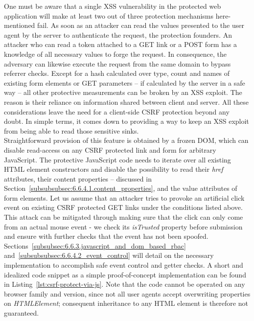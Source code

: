       One must be aware that a single XSS vulnerability in the protected web application will make at least two out of three protection mechanisms here-mentioned fail. As soon as an attacker can read the values presented to the user agent by the server to authenticate the request, the protection founders. An attacker who can read a token attached to a GET link or a POST form has a knowledge of all necessary values to forge the request. In consequence, the adversary can likewise execute the request from the same domain to bypass referrer checks. Except for a hash calculated over type, count and names of existing form elements or GET parameters -- if calculated by the server in a safe way -- all other protective measurements can be broken by an XSS exploit. The reason is their reliance on information shared between client and server. All these considerations leave the need for a client-side CSRF protection beyond any doubt. In simple terms, it comes down to providing a way to keep an XSS exploit from being able to read those sensitive sinks. \\

      Straightforward provision of this feature is obtained by a frozen DOM, which can disable read-access on any CSRF protected link and form for arbitrary JavaScript. The protective JavaScript code needs to iterate over all existing HTML element constructors and disable the possibility to read their \textit{href} attributes, their content properties -- discussed in Section~\ref{subsubsubsec:6.6.4.1.content_properties}, and the value attributes of form elements. 
      Let us assume that an attacker tries to provoke an artificial click event on existing CSRF protected GET links under the conditions listed above. This attack can be mitigated through making sure that the click can only come from an actual mouse event - we check its \textit{isTrusted} property before submission and ensure with further checks that the event has not been spoofed. Sections~\ref{subsubsec:6.6.3.javascript_and_dom_based_rbac} and~\ref{subsubsubsec:6.6.4.2_event_control} will detail on the necessary implementation to accomplish safe event control and getter checks. A short and idealized code snippet as a simple proof-of-concept implementation can be found in Listing~\ref{lst:csrf-protect-via-js}. Note that the code cannot be operated on any browser family and version, since not all user agents accept overwriting properties on \textit{HTMLElement}; consequent inheritance to any HTML element is therefore not guaranteed.

